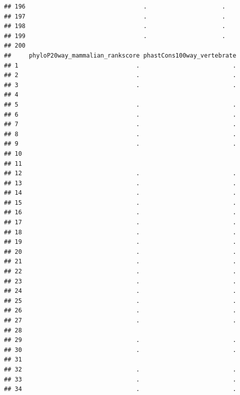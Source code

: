 \documentclass[
]{article}
\begin{document}
\begin{verbatim}
## 196                                 .                     .
## 197                                 .                     .
## 198                                 .                     .
## 199                                 .                     .
## 200                                                        
##     phyloP20way_mammalian_rankscore phastCons100way_vertebrate
## 1                                 .                          .
## 2                                 .                          .
## 3                                 .                          .
## 4                                                             
## 5                                 .                          .
## 6                                 .                          .
## 7                                 .                          .
## 8                                 .                          .
## 9                                 .                          .
## 10                                                            
## 11                                                            
## 12                                .                          .
## 13                                .                          .
## 14                                .                          .
## 15                                .                          .
## 16                                .                          .
## 17                                .                          .
## 18                                .                          .
## 19                                .                          .
## 20                                .                          .
## 21                                .                          .
## 22                                .                          .
## 23                                .                          .
## 24                                .                          .
## 25                                .                          .
## 26                                .                          .
## 27                                .                          .
## 28                                                            
## 29                                .                          .
## 30                                .                          .
## 31                                                            
## 32                                .                          .
## 33                                .                          .
## 34                                .                          .

\end{verbatim}
\end{document}
